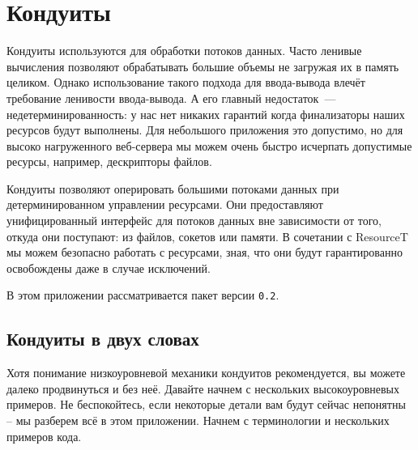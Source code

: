 \chapter{Кондуиты}\label{chap:conduit}

Кондуиты используются для обработки потоков данных. Часто ленивые вычисления
позволяют обрабатывать большие объемы не загружая их в память целиком. Однако 
использование такого подхода для ввода-вывода влечёт требование ленивости
ввода-вывода.
А его главный недостаток~--- недетерминированность: у нас нет никаких гарантий когда
финализаторы наших ресурсов будут выполнены. Для небольшого приложения это допустимо, но
для высоко нагруженного веб-сервера мы можем очень быстро исчерпать допустимые ресурсы,
например, дескрипторы файлов.

Кондуиты позволяют оперировать большими потоками данных при детерминированном управлении
ресурсами. Они предоставляют унифицированный интерфейс для потоков данных вне зависимости
от того, откуда они поступают: из файлов, сокетов или памяти. В сочетании с ResourceT мы
можем безопасно работать с ресурсами, зная, что они будут гарантированно освобождены даже
в случае исключений.

В этом приложении рассматривается пакет 
 версии \verb=0.2=.

\section{Кондуиты в двух словах}
Хотя понимание низкоуровневой механики кондуитов рекомендуется, вы можете далеко
продвинуться и без неё. Давайте начнем  с нескольких  высокоуровневых 	 примеров.  Не
беспокойтесь, если некоторые детали      вам   будут       сейчас	  непонятны -- 
  мы разберем всё  в этом   приложении. Начнем с терминологии и нескольких	  
примеров    кода.

